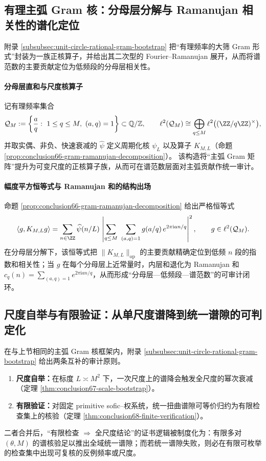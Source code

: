 

\subsection{有理主弧 Gram 核：分母层分解与 Ramanujan 相关性的谱化定位}\label{subsec:cdim-rational-major-arc-gram}
附录 \ref{subsubsec:unit-circle-rational-gram-bootstrap} 把“有理频率的大筛 Gram 形式”封装为一族正核算子，并给出其二次型的 Fourier--Ramanujan 展开，从而将谱范数的主要贡献定位为低频段的分母层相关性。

\paragraph{分母层直和与尺度核算子}
记有理频率集合
\[
\mathcal{Q}_M:=\left\{\frac{a}{q}:\ 1\le q\le M,\ (a,q)=1\right\}\subset\mathbb{Q}/\mathbb{Z},
\qquad
\ell^2(\mathcal{Q}_M)\cong\bigoplus_{q\le M}\ell^2\bigl((\ZZ/q\ZZ)^\times\bigr),
\]
并取实偶、非负、快速衰减的 \(\widehat\psi\) 定义周期化核 \(\psi_L\) 以及算子 \(K_{M,L}\)（命题 \ref{prop:conclusion66-gram-ramanujan-decomposition}）。
该构造将“主弧 Gram 矩阵”提升为可变尺度的正核算子族，从而可在谱范数层面对主弧贡献作统一审计。

\paragraph{幅度平方恒等式与 Ramanujan 和的结构出场}
命题 \ref{prop:conclusion66-gram-ramanujan-decomposition} 给出严格恒等式
\[
\langle g,K_{M,L}g\rangle
=\sum_{n\in\ZZ}\widehat\psi(n/L)\,
\left|\sum_{q\le M}\ \sum_{(a,q)=1} g(a/q)\,e^{2\pi\mathrm{i}an/q}\right|^2,
\qquad g\in\ell^2(\mathcal{Q}_M).
\]
在分母层分解下，该恒等式把 \(\|K_{M,L}\|_{\mathrm{op}}\) 的主要贡献精确定位到低频 \(n\) 段的指数和相关性；当 \(g\) 在每个分母层上近常量时，内层和退化为 Ramanujan 和 \(c_q(n)=\sum_{(a,q)=1}e^{2\pi\mathrm{i}an/q}\)，从而形成“分母层—低频段—谱范数”的可审计闭环。

\subsection{尺度自举与有限验证：从单尺度谱降到统一谱隙的可判定化}\label{subsec:cdim-scale-bootstrap-finite-verification}
在与上节相同的主弧 Gram 核框架内，附录 \ref{subsubsec:unit-circle-rational-gram-bootstrap} 给出两条互补的审计原则。
\begin{enumerate}
  \item \textbf{尺度自举：}在标度 \(L\asymp M^2\) 下，一次尺度上的谱降会触发全尺度的幂次衰减（定理 \ref{thm:conclusion67-scale-bootstrap}）。
  \item \textbf{有限验证：}对固定 primitive sofic--权系统，统一扭曲谱隙可等价归约为有限检查集上的核验（定理 \ref{thm:conclusion68-finite-verification}）。
\end{enumerate}
二者合并后，“有限检查 \(\Rightarrow\) 全尺度结论”的证书逻辑被制度化为：有限多对 \((\theta,M)\) 的谱核验足以推出全域统一谱隙；而若统一谱隙失败，则必在有限可枚举的检查集中出现可复核的反例频率或尺度。

